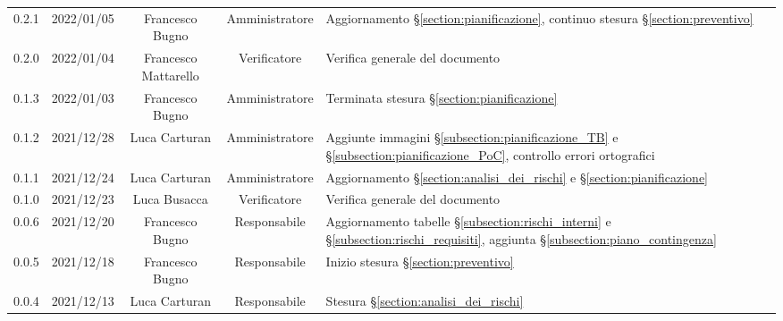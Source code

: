\begin{center}
\begin{longtable}[c]{c | c | c | c | p{5cm}}
		0.2.1                                                      & 2022/01/05 & Francesco Bugno                        & Amministratore & Aggiornamento §\ref{section:pianificazione}, continuo stesura §\ref{section:preventivo}                                                   \\
		0.2.0                                                      & 2022/01/04 & Francesco Mattarello                   & Verificatore   & Verifica generale del documento                                                                                                           \\
		0.1.3                                                      & 2022/01/03 & Francesco Bugno                        & Amministratore & Terminata stesura §\ref{section:pianificazione}                                                                                           \\
		0.1.2                                                      & 2021/12/28 & Luca Carturan                          & Amministratore & Aggiunte immagini §\ref{subsection:pianificazione_TB} e §\ref{subsection:pianificazione_PoC}, controllo errori ortografici                \\
		0.1.1                                                      & 2021/12/24 & Luca Carturan                          & Amministratore & Aggiornamento §\ref{section:analisi_dei_rischi} e §\ref{section:pianificazione}                                                           \\
		0.1.0                                                      & 2021/12/23 & Luca Busacca                           & Verificatore   & Verifica generale del documento                                                                                                           \\
		0.0.6                                                      & 2021/12/20 & Francesco Bugno                        & Responsabile   & Aggiornamento tabelle §\ref{subsection:rischi_interni} e §\ref{subsection:rischi_requisiti}, aggiunta §\ref{subsection:piano_contingenza} \\
		0.0.5                                                      & 2021/12/18 & Francesco Bugno                        & Responsabile   & Inizio stesura §\ref{section:preventivo}                                                                                                  \\
		0.0.4                                                      & 2021/12/13 & Luca Carturan                          & Responsabile   & Stesura §\ref{section:analisi_dei_rischi}                                                                                                 \\

\end{longtable}
\end{center}
